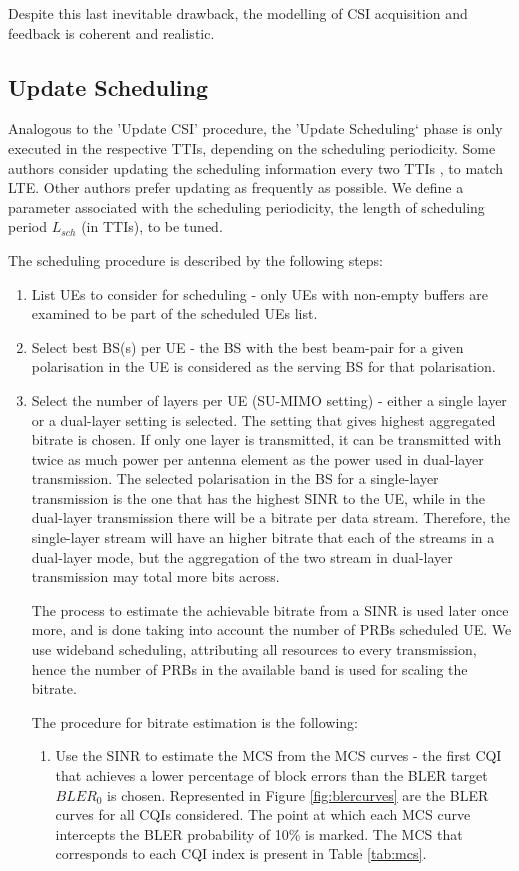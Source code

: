 Despite this last inevitable drawback, the modelling of \ac{CSI} acquisition and feedback is coherent and realistic.





\subsection{Update Scheduling}
Analogous to the 'Update CSI' procedure, the 'Update Scheduling` phase is only executed in the respective TTIs, depending on the scheduling periodicity. Some authors consider updating the scheduling information every two TTIs \cite{7986957}, to match LTE. Other authors \cite{dmimo-remco} prefer updating as frequently as possible. We define a parameter associated with the scheduling periodicity, the length of scheduling period $L_{sch}$ (in TTIs), to be tuned.

The scheduling procedure is described by the following steps:

\begin{enumerate}
    \item List UEs to consider for scheduling - only UEs with non-empty buffers are examined to be part of the scheduled UEs list. 
    \item Select best BS(s) per UE - the BS with the best beam-pair for a given polarisation in the UE is considered as the serving BS for that polarisation.
    \item Select the number of layers per UE (SU-MIMO setting) - either a single layer or a dual-layer setting is selected. The setting that gives highest aggregated bitrate is chosen. If only one layer is transmitted, it can be transmitted with twice as much power per antenna element as the power used in dual-layer transmission. The selected polarisation in the BS for a single-layer transmission is the one that has the highest SINR to the UE, while in the dual-layer transmission there will be a bitrate per data stream. Therefore, the single-layer stream will have an higher bitrate that each of the streams in a dual-layer mode, but the aggregation of the two stream in dual-layer transmission may total more bits across.
    
    The process to estimate the achievable bitrate from a SINR is used later once more, and is done taking into account the number of PRBs scheduled UE. We use wideband scheduling, attributing all resources to every transmission, hence the number of PRBs in the available band is used for scaling the bitrate. 
    
    The procedure for bitrate estimation is the following:
    \begin{enumerate}
        \item Use the SINR to estimate the MCS from the MCS curves - the first \ac{CQI} that achieves a lower percentage of block errors than the \ac{BLER} target $BLER_0$ is chosen. Represented in Figure \ref{fig:blercurves} are the BLER curves for all CQIs considered. The point at which each MCS curve intercepts the BLER probability of 10\% is marked. The MCS that corresponds to each CQI index is present in Table \ref{tab:mcs}.
    \end{enumerate}
\end{enumerate}


